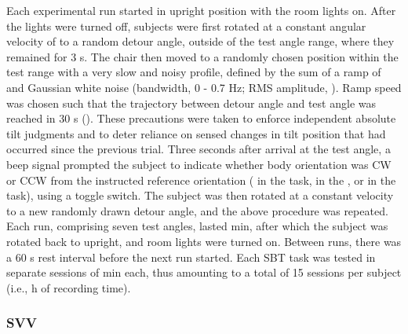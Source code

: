 Each experimental run started in upright position with the room lights on. After the lights were turned off, subjects were first rotated at a constant angular velocity of  to a random detour angle, outside of the test angle range, where they remained for 3 s. The chair then moved to a randomly chosen position within the test range with a very slow and noisy profile, defined by the sum of a ramp of  and Gaussian white noise (bandwidth, 0 - 0.7 Hz; RMS amplitude, ). Ramp speed was chosen such that the trajectory between detour angle and test angle was reached in 30 \si{\second} (). These precautions were taken to enforce independent absolute tilt judgments and to deter reliance on sensed changes in tilt position that had occurred since the previous trial. Three seconds after arrival at the test angle, a beep signal prompted the subject to indicate whether body orientation was CW or CCW from the instructed reference orientation ( in the  task,  in the , or  in the  task), using a toggle switch. The subject was then rotated at a constant velocity to a new randomly drawn detour angle, and the above procedure was repeated. Each run, comprising seven test angles, lasted  min, after which the subject was rotated back to upright, and room lights were turned on. Between runs, there was a 60 s rest interval before the next run started. Each SBT task was tested in separate sessions of  min each, thus amounting to a total of 15 sessions per subject (i.e.,  h of recording time).

\subsubsection{SVV}

